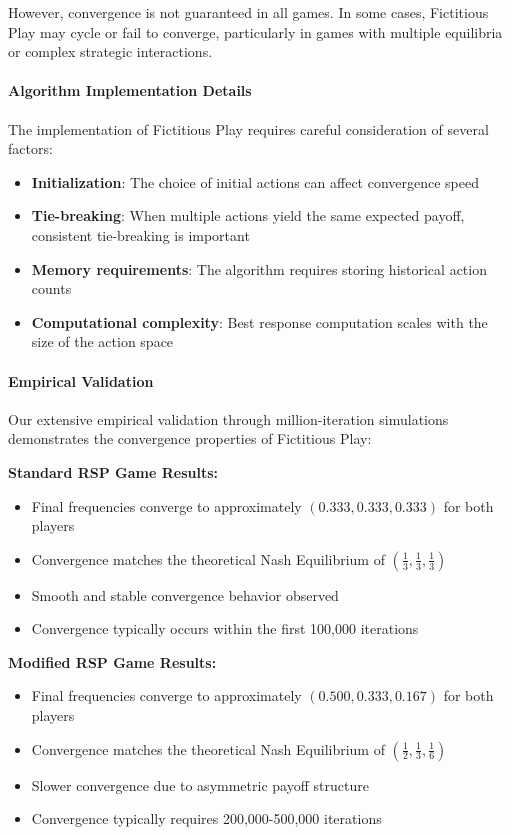 \documentclass[conference]{IEEEtran}
\begin{document}
However, convergence is not guaranteed in all games. In some cases, Fictitious Play may cycle or fail to converge, particularly in games with multiple equilibria or complex strategic interactions.

\paragraph{Algorithm Implementation Details}

The implementation of Fictitious Play requires careful consideration of several factors:

\begin{itemize}
    \item \textbf{Initialization}: The choice of initial actions can affect convergence speed
    \item \textbf{Tie-breaking}: When multiple actions yield the same expected payoff, consistent tie-breaking is important
    \item \textbf{Memory requirements}: The algorithm requires storing historical action counts
    \item \textbf{Computational complexity}: Best response computation scales with the size of the action space
\end{itemize}

\paragraph{Empirical Validation}

Our extensive empirical validation through million-iteration simulations demonstrates the convergence properties of Fictitious Play:

\textbf{Standard RSP Game Results:}
\begin{itemize}
    \item Final frequencies converge to approximately $(0.333, 0.333, 0.333)$ for both players
    \item Convergence matches the theoretical Nash Equilibrium of $(\frac{1}{3}, \frac{1}{3}, \frac{1}{3})$
    \item Smooth and stable convergence behavior observed
    \item Convergence typically occurs within the first 100,000 iterations
\end{itemize}

\textbf{Modified RSP Game Results:}
\begin{itemize}
    \item Final frequencies converge to approximately $(0.500, 0.333, 0.167)$ for both players
    \item Convergence matches the theoretical Nash Equilibrium of $(\frac{1}{2}, \frac{1}{3}, \frac{1}{6})$
    \item Slower convergence due to asymmetric payoff structure
    \item Convergence typically requires 200,000-500,000 iterations
\end{itemize}
\end{document}
